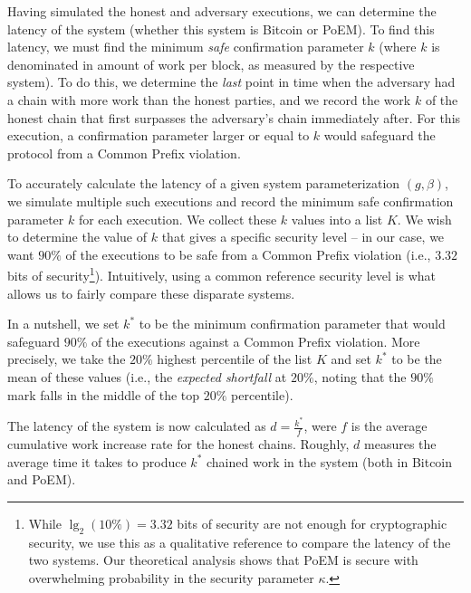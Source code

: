 Having simulated the honest and adversary executions, we can determine the latency of the system (whether this system is Bitcoin or PoEM).
To find this latency, we must find the minimum \emph{safe} confirmation parameter $k$ (where $k$ is denominated in amount of work per block, as measured
by the respective system).
To do this, we determine the \emph{last} point in time when the adversary had a chain with more work than the honest parties,
and we record the work $k$ of the honest chain that first surpasses the adversary's chain immediately after.
For this execution, a confirmation parameter larger or equal to $k$ would safeguard the protocol from a Common Prefix violation.

To accurately calculate the latency of a given system parameterization $(g, \beta)$, we simulate multiple such executions and record the minimum safe confirmation
parameter $k$ for each execution. We collect these $k$ values into a list $K$. We wish to determine the value of $k$ that gives a specific
security level -- in our case, we want $90\%$ of the executions to be safe from a Common Prefix violation (i.e., $3.32$ bits of
security\footnote{While $\lg_2(10\%) = 3.32$ bits of security are not enough for cryptographic security, we use this as a qualitative
reference to compare the latency of the two systems. Our theoretical analysis shows that PoEM is secure with overwhelming probability
in the security parameter $\kappa$.}).
Intuitively, using a common reference security level is what allows us to fairly compare these disparate systems.

In a nutshell, we set $k^*$ to be the minimum confirmation parameter that would safeguard $90\%$ of the executions against a Common Prefix violation.
More precisely, we take the $20\%$ highest percentile of the list $K$ and set $k^*$ to be the mean of these values (i.e., the \emph{expected shortfall}
at $20\%$, noting that the $90\%$ mark falls in the middle of the top $20\%$ percentile).

The latency of the system is now calculated as $d = \frac{k^*}{f}$, were $f$ is the average cumulative work increase rate for the honest chains.
Roughly, $d$ measures the average time it takes to produce $k^*$ chained work in the system (both in Bitcoin and PoEM).

